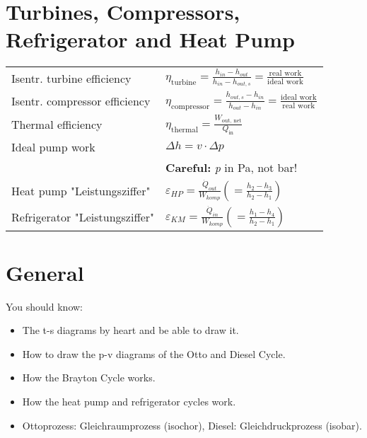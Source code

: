 \section*{Turbines, Compressors, Refrigerator and Heat Pump}
    \begin{tabular}{ m{5cm} l}
    Isentr. turbine efficiency & $\eta_{\text{turbine}} = \frac{h_{in} - h_{out}}{h_{in} - h_{out,s}} = \frac{\text{real work}}{\text{ideal work}} $ \\
    Isentr. compressor efficiency & $\eta_{\text{compressor}} = \frac{h_{out,s} - h_{in}}{h_{out} - h_{in}} = \frac{\text{ideal work}}{\text{real work}} $  \\
    Thermal efficiency & $\eta_{\text{thermal}} = \frac{W_{\text{out, net}}}{Q_{\text{in}}} $ \\
    Ideal pump work & $\Delta h = v \cdot \Delta p$ \\
    & \textbf{Careful:} \textit{p} in Pa, not bar! \\
    Heat pump "Leistungsziffer" & $\varepsilon_{HP} = \frac{\Dot{Q}_{out}}{W_{komp}} \left( = \frac{h_2 - h_3}{h_2 - h_1} \right) $ \\
    Refrigerator "Leistungsziffer" & $\varepsilon_{KM} = \frac{\Dot{Q}_{in}}{W_{komp}} \left( = \frac{h_1 - h_4}{h_2 - h_1} \right)$ \\
    \end{tabular}
    
\section*{General}
You should know:
\begin{itemize}
    \item The t-s diagrams by heart and be able to draw it.
    \item How to draw the p-v diagrams of the Otto and Diesel Cycle.
    \item How the Brayton Cycle works. 
    \item How the heat pump and refrigerator cycles work.
    \item Ottoprozess: Gleichraumprozess (isochor), Diesel: Gleichdruckprozess (isobar).
    
    
\end{itemize}


